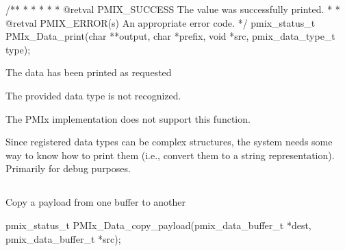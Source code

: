 \cspecificstart
\begin{codepar}
/**
 *
 *
 *
 *
 * @retval PMIX_SUCCESS The value was successfully printed.
 *
 * @retval PMIX_ERROR(s) An appropriate error code.
 */
pmix_status_t
PMIx_Data_print(char **output, char *prefix,
                void *src, pmix_data_type_t type);
\end{codepar}
\cspecificend

\begin{arglist}
\end{arglist}

\begin{constantdesc}
\item {} The data has been printed as requested
\item {} The provided data type is not recognized.
\item {} The \ac{PMIx} implementation does not support this function.
\end{constantdesc}

\descr

Since registered data types can be complex structures, the system needs some way to know how to print them (i.e., convert them to a string representation). Primarily for debug purposes.


\subsection{}

\summary

Copy a payload from one buffer to another

\format

\cspecificstart
\begin{codepar}
pmix_status_t
PMIx_Data_copy_payload(pmix_data_buffer_t *dest,
                       pmix_data_buffer_t *src);
\end{codepar}
\cspecificend

\begin{arglist}
\end{arglist}


